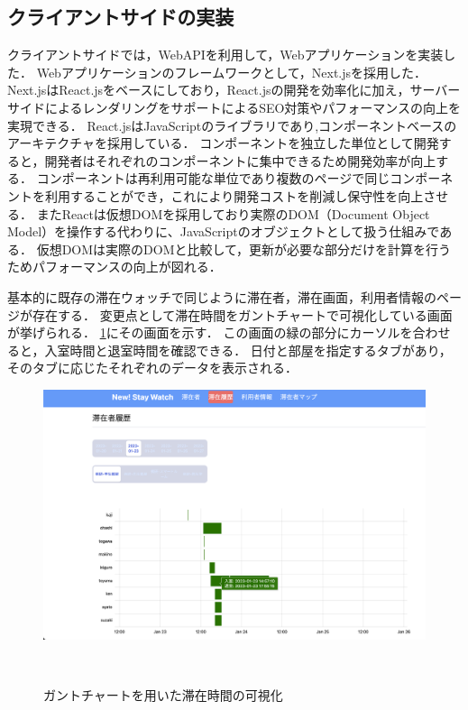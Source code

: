 

\subsection{クライアントサイドの実装}\label{4.1.2}
クライアントサイドでは，WebAPIを利用して，Webアプリケーションを実装した．
Webアプリケーションのフレームワークとして，Next.jsを採用した．
Next.jsはReact.jsをベースにしており，React.jsの開発を効率化に加え，サーバーサイドによるレンダリングをサポートによるSEO対策やパフォーマンスの向上を実現できる．
React.jsはJavaScriptのライブラリであり,コンポーネントベースのアーキテクチャを採用している．
コンポーネントを独立した単位として開発すると，開発者はそれぞれのコンポーネントに集中できるため開発効率が向上する．
コンポーネントは再利用可能な単位であり複数のページで同じコンポーネントを利用することができ，これにより開発コストを削減し保守性を向上させる．
またReactは仮想DOMを採用しており実際のDOM（Document Object Model）を操作する代わりに、JavaScriptのオブジェクトとして扱う仕組みである．
仮想DOMは実際のDOMと比較して，更新が必要な部分だけを計算を行うためパフォーマンスの向上が図れる．



基本的に既存の滞在ウォッチで同じように滞在者，滞在画面，利用者情報のページが存在する．
変更点として滞在時間をガントチャートで可視化している画面が挙げられる．
\ref{fig:gantt}にその画面を示す．
この画面の緑の部分にカーソルを合わせると，入室時間と退室時間を確認できる．
日付と部屋を指定するタブがあり，そのタブに応じたそれぞれのデータを表示される．

\begin{figure}[tbh]
  \centering
  \includegraphics[width=16cm]{image/gantt.jpg}
  \caption{ガントチャートを用いた滞在時間の可視化}　\label{fig:gantt}
\end{figure}













